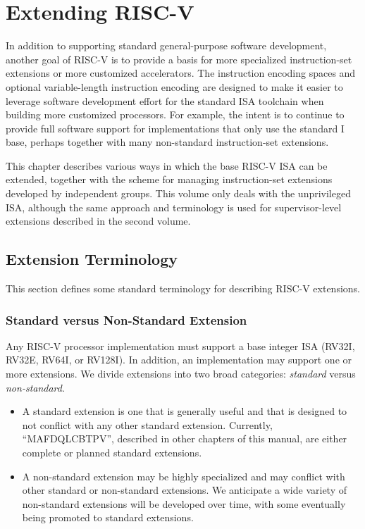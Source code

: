 \chapter{Extending RISC-V}
\label{extensions}

In addition to supporting standard general-purpose software
development, another goal of RISC-V is to provide a basis for more
specialized instruction-set extensions or more customized
accelerators.  The instruction encoding spaces and optional
variable-length instruction encoding are designed to make it easier to
leverage software development effort for the standard ISA toolchain
when building more customized processors.  For example, the intent is
to continue to provide full software support for implementations that
only use the standard I base, perhaps together with many non-standard
instruction-set extensions.

This chapter describes various ways in which the base RISC-V ISA can
be extended, together with the scheme for managing instruction-set
extensions developed by independent groups.  This volume only deals
with the unprivileged ISA, although the same approach and terminology is
used for supervisor-level extensions described in the second volume.

\section{Extension Terminology}

This section defines some standard terminology for describing RISC-V
extensions.
\vspace{-0.2in}
\subsection*{Standard versus Non-Standard Extension}

Any RISC-V processor implementation must support a base integer ISA
(RV32I, RV32E, RV64I, or RV128I).  In addition, an implementation may
support one or more extensions.  We divide extensions into two broad
categories: {\em standard} versus {\em non-standard}.
\begin{itemize}
\item A standard extension is one that is generally useful and that is
  designed to not conflict with any other standard extension.
  Currently, ``MAFDQLCBTPV'', described in other chapters of this
  manual, are either complete or planned standard extensions.
\item A non-standard extension may be highly specialized and may
  conflict with other standard or non-standard extensions.  We
  anticipate a wide variety of non-standard extensions will be
  developed over time, with some eventually being promoted to standard
  extensions.
\end{itemize}

